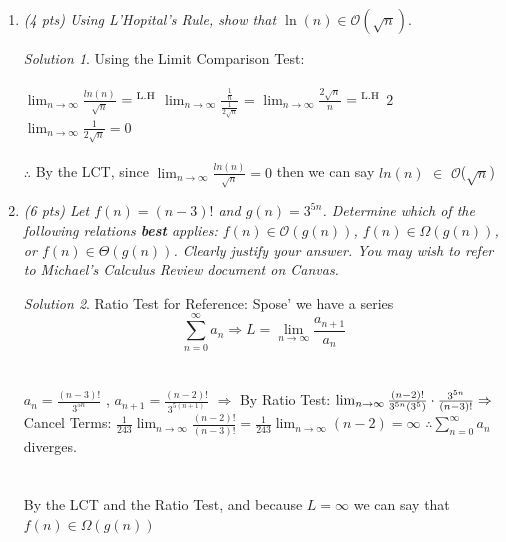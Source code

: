 \documentclass[12pt]{article}
\theoremstyle{remark}
\newtheorem*{solution}{Solution}
\newcommand{\makenonemptybox}[2]{%
\item[]
\fbox{%
\parbox[c][#1][t]{\dimexpr\linewidth-2\fboxsep-2\fboxrule}{
  \hrule width \hsize height 0pt
  #2
 }%
}%
\par\vspace{\ht\strutbox}
}
\begin{document}
\hrulefill

\begin{enumerate}


\pagebreak
\item {\itshape (4 pts) Using L'Hopital's Rule, show that $\ln(n) \in \mathcal{O}(\sqrt{n}).$}
\begin{solution}
Using the Limit Comparison Test: \\ \\ $\lim_{n\to\infty} \frac{ln(n)}{\sqrt{n}}$ $=\textsuperscript{L.H}$ $\lim_{n\to\infty} \frac{\frac{1}{n}}{\frac{1}{2\sqrt{n}}}$ = $\lim_{n\to\infty} \frac{2\sqrt{n}}{n}$ $=\textsuperscript{L.H}$ $2$ $\lim_{n\to\infty} \frac{1}{2\sqrt{n}} = 0$ \\ \\ $\therefore$ By the LCT, since $\lim_{n\to\infty} \frac{ln(n)}{\sqrt{n}} = 0$ then we can say $ln(n)$ $\in$ $\mathcal{O}$($\sqrt{n}$)
\end{solution}

\pagebreak
\item {\itshape (6 pts) Let $f(n) = (n-3)!$ and $g(n) = 3^{5n}$. Determine which of the following relations \textbf{best} applies: $f(n) \in \mathcal{O}(g(n))$, $f(n) \in \Omega(g(n))$, or $f(n) \in \Theta(g(n))$. Clearly justify your answer. You may wish to refer to Michael's Calculus Review document on Canvas.}
\begin{solution}
Ratio Test for Reference: Spose' we have a series $$\sum_{n=0}^{\infty} a_n\Rightarrow L=\lim_{n\to\infty} \frac{a_{n+1}}{a_n}$$ \\ \\ $a_n = \frac{(n-3)!}{3^{5n}}$ , $a_{n+1} = \frac{(n-2)!}{3^{5(n+1)}}$ $\Rightarrow$ By Ratio Test: $\lim_{n\to\infty} \frac{(n-2)!}{3^{5n}(3^5)}\cdot\frac{3^{5n}}{(n-3)!}\\ \\ \Rightarrow$ Cancel Terms: $\frac{1}{243}\lim_{n\to\infty} \frac{(n-2)!}{(n-3)!} = \frac{1}{243}\lim_{n\to\infty} (n-2) = \infty$ $\therefore \sum_{n=0}^{\infty}a_n$ diverges. \\ \\ \\ By the LCT and the Ratio Test, and because $L = \infty$ we can say that $f(n) \in \Omega (g(n))$
\end{solution}



\end{enumerate}
\end{document}
